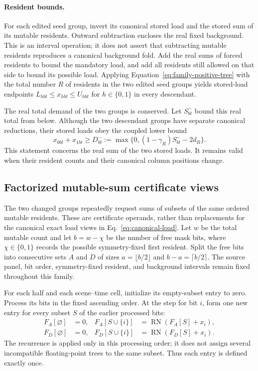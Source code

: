 \documentclass[11pt]{article}
\begin{document}
\paragraph{Resident bounds.}
For each edited seed group, invert its canonical stored load and the stored sum of its mutable residents.  Outward subtraction encloses the real fixed background.  This is an interval operation; it does not assert that subtracting mutable residents reproduces a canonical background fold.  Add the real sums of forced residents to bound the mandatory load, and add all residents still allowed on that side to bound its possible load.  Applying Equation~\eqref{eq:family-positive-tree} with the total number $R$ of residents in the two edited seed groups yields stored-load endpoints $L_{hbt}\le x_{hbt}\le U_{hbt}$ for $h\in\{0,1\}$ in every descendant.

The real total demand of the two groups is conserved.  Let $S^-_{bt}$ bound this real total from below.  Although the two descendant groups have separate canonical reductions, their stored loads obey the coupled lower bound
\begin{equation}
 x_{0bt}+x_{1bt}\ge
 D^-_{bt}:=\max\{0,(1-\gamma_R)S^-_{bt}-2d_R\}.
 \label{eq:family-pair-conservation}
\end{equation}
This statement concerns the real sum of the two stored loads.  It remains valid when their resident counts and their canonical column positions change.

\subsection{Factorized mutable-sum certificate views}\label{sec:factorized-sum-certificates}
The two changed groups repeatedly request sums of subsets of the same ordered mutable residents. These are certificate operands, rather than replacements for the canonical exact load views in Eq.~\eqref{eq:canonical-load}. Let $w$ be the total mutable count and let $b=w-\chi$ be the number of free mask bits, where $\chi\in\{0,1\}$ records the possible symmetry-fixed first resident. Split the free bits into consecutive sets $A$ and $D$ of sizes $a=\lfloor b/2\rfloor$ and $b-a=\lceil b/2\rceil$. The source panel, bit order, symmetry-fixed resident, and background intervals remain fixed throughout this family.

For each half and each scene--time cell, initialize its empty-subset entry to zero. Process its bits in the fixed ascending order. At the step for bit $i$, form one new entry for every subset $S$ of the earlier processed bits:
\begin{align}
F_A[\varnothing]&=0,&F_A[S\cup\{i\}]&=\operatorname{RN}(F_A[S]+x_i),\nonumber\\
F_D[\varnothing]&=0,&F_D[S\cup\{i\}]&=\operatorname{RN}(F_D[S]+x_i).
\label{eq:half-subset-tables}
\end{align}
The recurrence is applied only in this processing order; it does not assign several incompatible floating-point trees to the same subset. Thus each entry is defined exactly once.
\end{document}
